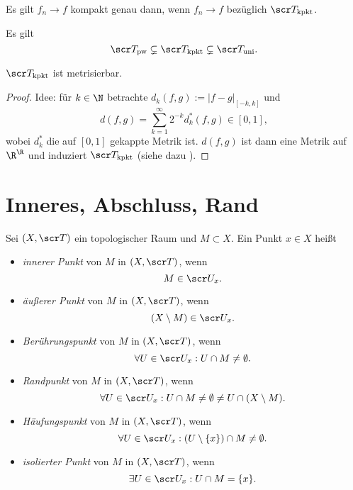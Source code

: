 \begin{st}
	Es gilt $f_n \to f$ kompakt genau dann, wenn $f_n \to f$ bezüglich $\scr T_{\text{kpkt}}$.
\end{st}

\begin{nt}
	Es gilt
	\[
		\scr T_{\text{pw}} \subsetneq \scr T_{\text{kpkt}} \subsetneq \scr T_{\text{uni}}.
	\]
\end{nt}

\begin{st}
	$\scr T_{\text{kpkt}}$ ist metrisierbar.
	\begin{proof}
		Idee: für $k \in \N$ betrachte $d_k(f,g) := |f-g|_{[-k,k]}$ und
		\[
			d(f,g) = \sum_{k=1}^\infty 2^{-k} d_k^* (f,g) \in [0,1],
		\]
		wobei $d_k^*$ die auf $[0,1]$ gekappte Metrik ist.
		$d(f,g)$ ist dann eine Metrik auf $\R^\R$ und induziert $\scr T_{\text{kpkt}}$ (siehe dazu ).
	\end{proof}
\end{st}


\section{Inneres, Abschluss, Rand}


Sei $(X, \scr T)$ ein topologischer Raum und $M \subset X$.
Ein Punkt $x \in X$ heißt
\begin{itemize}
	\item
		\emph{innerer Punkt} von $M$ in $(X,\scr T)$, wenn
		\[
			M \in \scr U_x.
		\]
	\item
		\emph{äußerer Punkt} von $M$ in $(X,\scr T)$, wenn
		\[
			(X \setminus M) \in \scr U_x.
		\]
	\item
		\emph{Berührungspunkt} von $M$ in $(X, \scr T)$, wenn
		\[
			\forall U \in \scr U_x : U \cap M \neq \emptyset.
		\]
	\item
		\emph{Randpunkt} von $M$ in $(X, \scr T)$, wenn
		\[
			\forall U \in \scr U_x : U \cap M \neq \emptyset \neq U \cap (X \setminus M).
		\]
	\item
		\emph{Häufungspunkt} von $M$ in $(X, \scr T)$, wenn
		\[
			\forall U \in \scr U_x : (U \setminus \{x\}) \cap M \neq \emptyset.
		\]
	\item
		\emph{isolierter Punkt} von $M$ in $(X, \scr T)$, wenn
		\[
			\exists U \in \scr U_x : U \cap M = \{x\}.
		\]
\end{itemize}

